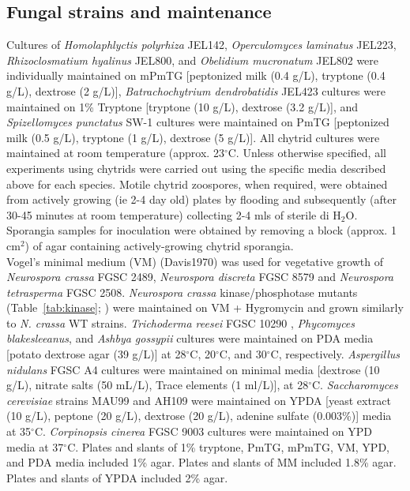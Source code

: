 \subsection{Fungal strains and maintenance}
Cultures of \textit{Homolaphlyctis polyrhiza} JEL142, \textit{Operculomyces laminatus} JEL223, \textit{Rhizoclosmatium hyalinus} JEL800, and \textit{Obelidium mucronatum} JEL802 were individually maintained on mPmTG [peptonized milk (0.4 g/L), tryptone (0.4 g/L), dextrose (2 g/L)], \textit{Batrachochytrium dendrobatidis} JEL423 cultures were maintained on 1\% Tryptone [tryptone (10 g/L), dextrose (3.2 g/L)], and \textit{Spizellomyces punctatus} SW-1 cultures were maintained on PmTG [peptonized milk (0.5 g/L), tryptone (1 g/L), dextrose (5 g/L)]. All chytrid cultures were maintained at room temperature (approx. 23$^{\circ}$C. Unless otherwise specified, all experiments using chytrids were carried out using the specific media described above for each species. Motile chytrid zoospores, when required, were obtained from actively growing (ie 2-4 day old) plates by flooding and subsequently (after 30-45 minutes at room temperature) collecting 2-4 mls of sterile di H$_{2}$O. Sporangia samples for inoculation were obtained by removing a block (approx. 1 cm$^{2}$) of agar containing actively-growing chytrid sporangia.\\
\indent Vogel's minimal medium (VM) (Davis1970) was used for vegetative growth of \textit{Neurospora crassa} FGSC 2489, \textit{Neurospora discreta} FGSC 8579 and \textit{Neurospora tetrasperma} FGSC 2508. \textit{Neurospora crassa} kinase/phosphotase mutants (Table~\ref{tab:kinase}; \cite{Park2011}) were maintained on VM + Hygromycin and grown similarly to \textit{N. crassa} WT strains. \textit{Trichoderma reesei} FGSC 10290 , \textit{Phycomyces blakesleeanus}, and \textit{Ashbya gossypii} cultures were maintained on PDA media [potato dextrose agar (39 g/L)] at 28$^{\circ}$C, 20$^{\circ}$C, and 30$^{\circ}$C, respectively. \textit{Aspergillus nidulans} FGSC A4 cultures were maintained on minimal media [dextrose (10 g/L), nitrate salts (50 mL/L), Trace elements (1 ml/L)], at 28$^{\circ}$C. \textit{Saccharomyces cerevisiae} strains MAU99 and AH109 were maintained on YPDA [yeast extract (10 g/L), peptone (20 g/L), dextrose (20 g/L), adenine sulfate (0.003\%)] media at 35$^{\circ}$C. \textit{Corpinopsis cinerea} FGSC 9003 cultures were maintained on YPD media at 37$^{\circ}$C.  Plates and slants of 1\% tryptone, PmTG, mPmTG, VM, YPD, and PDA media included 1\% agar. Plates and slants of MM included 1.8\% agar. Plates and slants of YPDA included 2\% agar.\\

